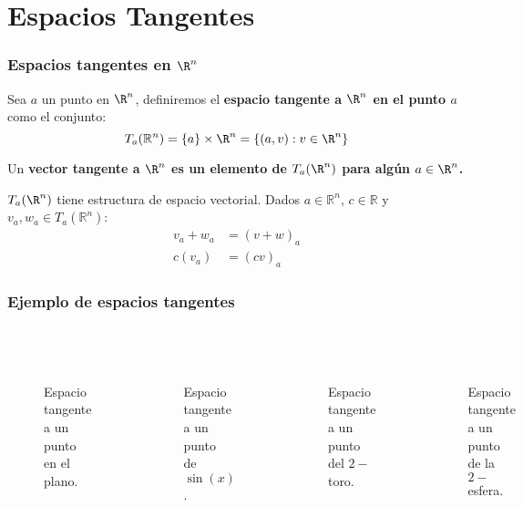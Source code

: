 \section{Espacios Tangentes}
\begin{frame}
	\frametitle{Espacios tangentes en $\R^n$}
	\begin{definition}\label{Definición: Espacio Tangente en Rn}
		Sea $a$ un punto en $\R^n$, definiremos el \textbf{espacio tangente a $\R^n$ en el punto $a$} como el conjunto:
		\[ T_{a}(\mathbb{R}^{n}) = \{a\} \times \R^n = \{(a,v): v \in \R^n\} \]

		Un \bf{vector tangente} a $\R^n$ es un elemento de $T_a(\R^n)$ para algún $a \in \R^n$.
	\end{definition}\pause

	$T_a(\R^n)$ tiene estructura de espacio vectorial. Dados $a \in \mathbb{R}^{n}$, $c \in \mathbb{R}$ y $v_a, w_a \in T_a(\mathbb{R}^n)$:
	\begin{align*}
		v_a + w_a & = (v+w)_a \\
		c(v_a)    & = (cv)_a
	\end{align*}
\end{frame}

\begin{frame}
	\frametitle{Ejemplo de espacios tangentes}
	\begin{columns}[t]
		\centering
		\begin{figure}
			\vspace{-12pt}
			\scalebox{.4}{}\\
			\caption{Espacio tangente a un punto \\ en el plano.}
		\end{figure}
		\begin{figure}
			\vspace{-12pt}
			\scalebox{.4}{}\\
			\caption{Espacio tangente a un punto \\ de $\sin(x)$.}
		\end{figure}
		\centering
		\begin{figure}
			\scalebox{.5}{}\\
			\caption{Espacio tangente a un punto \\ del $2-$toro.}
		\end{figure}
		\begin{figure}
			\vspace{-12pt}
			\scalebox{.45}{}\\
			\caption{Espacio tangente a un punto \\ de la $2-$esfera.}
		\end{figure}
	\end{columns}
\end{frame}

